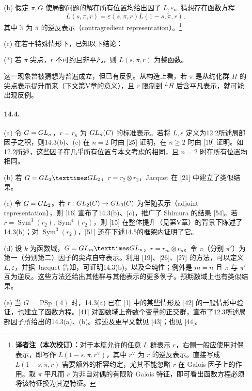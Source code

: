 (b) 假定 $\pi,G$ 使局部问题的解在所有位置均给出因子 $L,\varepsilon$。猜想存在函数方程
\[
 L(s,\pi,r)=\varepsilon(s,\pi,r)L(1-s,\widetilde\pi,r),
\]
其中 $\widetilde\pi$ 为 $\pi$ 的逆反表示（contragredient representation）。\footnote{\textbf{译者注（本次校订）：}对于本篇允许的任意 $L$ 群表示 $r$，右侧一般应使用对偶表示，即写作 $L(1-s,\pi,r^\vee)$，其中 $r^\vee$ 为 $r$ 的逆反表示。直接写成 $L(1-s,\widetilde\pi,r)$ 需要额外的相容约定，尤其不能忽略 $r$ 在 Galois 因子上的作用。取 $\pi$ 平凡而 $r$ 为非自对偶的有限阶 Galois 特征，即可看出函数方程必须将该特征换为其逆特征。}

(c) 在若干特殊情形下，已知以下结论：

(*) 若 $\pi$ 尖点，$r$ 不可约且非平凡，则 $L(s,\pi,r)$ 为整函数。

这一现象曾被猜想为普遍成立，但已有反例。从构造上看，若 $\pi$ 是从约化群 $H$ 的尖点表示提升而来（下文第V章的意义），且 $r$ 限制到 ${}^LH$ 后含平凡表示，就可能出现反例。

\paragraph*{14.4.} (a) 令 $G=GL_n$，$r=r_n$ 为 $GL_n(C)$ 的标准表示。若将 $L,\varepsilon$ 定义为12.2所述局部因子之积，则14.3(b)、(c) 在 $n=2$ 时由 [25] 证明，在 $n\geq2$ 时由 [19] 证明。如12.2所述，这些因子在几乎所有位置与本文考虑的相同，且 $n=2$ 时在所有位置均相同。

(b) 若 $G=\GL_2\times\GL_2$，$r=r_2\otimes r_2$，Jacquet 在 [21] 中建立了类似结果。

(c) 令 $G=GL_2$。若 $r:GL_2(C)\to GL_3(C)$ 为伴随表示（adjoint representation），则 [16] 宣布了14.3(b)、(c)，推广了 Shimura 的结果 [54]。若 $r=\operatorname{Sym}^3(r_2),\operatorname{Sym}^4(r_2)$，则 [15] 在整体提升（见第V章）的背景下陈述了14.3(b)；对 $\operatorname{Sym}^3(r_2)$，[51] 还在下述14.5的框架内证明了它。

(d) 设 $k$ 为函数域，$G=\GL_m\times\GL_n$，$r=r_m\otimes r_n$。令 $\pi$（分别 $\pi'$）为第一（分别第二）因子的尖点自守表示。利用 [19]、[26]、[27] 的方法，可以定义 $L,\varepsilon$，并据 Jacquet 告知，可证明14.3(b)，以及全纯性；例外是 $m=n$ 且 $\pi$ 与 $\pi'$ 互为逆反。这些方法还给出其他群与其他表示的更多例子。预期数域上也有类似结果。

(e) 当 $G=\operatorname{PSp}(4)$ 时，14.3(a) 已在 [1] 中的某些情形及 [42] 的一般情形中验证，也建立了函数方程。[41] 对函数域上奇数个变量的正交群，宣布了12.3所述局部因子所给出的14.3(a)、(b)。综述及更早文献见 [43]；也见 [44]。


